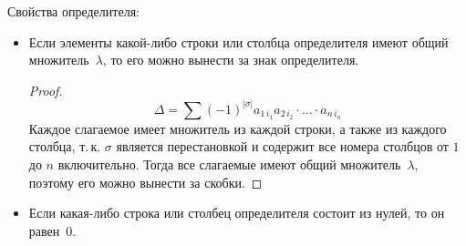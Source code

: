 Свойства определителя:
\begin{itemize}
	\item Если элементы какой-либо строки или столбца определителя имеют общий множитель~$\lambda$, то его можно вынести за знак определителя.
	\begin{proof}
	\begin{equation*}
	\Delta = \sum (-1)^{|\sigma|} a_{1\, i_1} a_{2\, i_2} \cdot \ldots \cdot a_{n\, i_n}
	\end{equation*}
	Каждое слагаемое имеет множитель из каждой строки, а также из каждого столбца, т.\,к. $\sigma$ является перестановкой и содержит все номера столбцов от $1$ до $n$ включительно.
	Тогда все слагаемые имеют общий множитель~$\lambda$, поэтому его можно вынести за скобки.
	\end{proof}
	
	\item Если какая-либо строка или столбец определителя состоит из нулей, то он равен~$0$.
	

\end{itemize}
